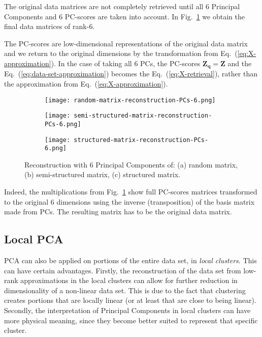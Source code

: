 \documentclass[10pt,twocolumn]{article}
\begin{document}
The original data matrices are not completely retrieved until all 6 Principal Components and 6 PC-scores are taken into account. In Fig.~\ref{fig:matrices-reconstruction-6} we obtain the final data matrices of rank-6.

The PC-scores are low-dimensional representations of the original data matrix and we return to the original dimensions by the transformation from Eq.~(\ref{eq:X-approximation}). In the case of taking all 6 PCs, the PC-scores $\mathbf{Z_q} = \mathbf{Z}$ and the Eq.~(\ref{eq:data-set-approximation}) becomes the Eq.~(\ref{eq:X-retrieval}), rather than the approximation from Eq.~(\ref{eq:X-approximation}).

\begin{figure}[H]
\begin{subfigure}[t]{.15\textwidth}
\centering
\texttt{[image: random-matrix-reconstruction-PCs-6.png]}
\caption{ }
\end{subfigure}
\begin{subfigure}[t]{.15\textwidth}
\centering
\texttt{[image: semi-structured-matrix-reconstruction-PCs-6.png]}
\caption{ }
\end{subfigure}
\begin{subfigure}[t]{.15\textwidth}
\centering
\texttt{[image: structured-matrix-reconstruction-PCs-6.png]}
\caption{ }
\end{subfigure}
\caption{Reconstruction with 6 Principal Components of: (a) random matrix, (b) semi-structured matrix, (c) structured matrix.}
\label{fig:matrices-reconstruction-6}
\end{figure}

Indeed, the multiplications from Fig.~\ref{fig:matrices-reconstruction-6} show full PC-scores matrices transformed to the original 6 dimensions using the inverse (transposition) of the basis matrix made from PCs. The resulting matrix has to be the original data matrix.



\subsection{Local PCA}

PCA can also be applied on portions of the entire data set, in \textit{local clusters}. This can have certain advantages. Firstly, the reconstruction of the data set from low-rank approximations in the local clusters can allow for further reduction in dimensionality of a non-linear data set. This is due to the fact that clustering creates portions that are locally linear (or at least that are close to being linear). Secondly, the interpretation of Principal Components in local clusters can have more physical meaning, since they become better suited to represent that specific cluster.
\end{document}
